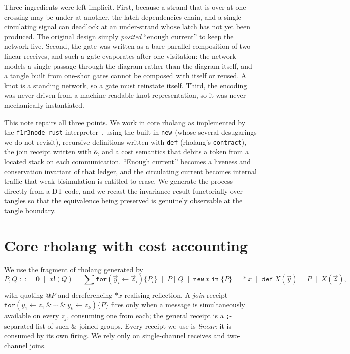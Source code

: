\documentclass[11pt]{article}
\theoremstyle{definition}
\newcommand{\Nil}{\mathbf{0}}
\begin{document}
Three ingredients were left implicit. First, because a strand that is over at one
crossing may be under at another, the latch dependencies chain, and a single
circulating signal can deadlock at an under-strand whose latch has not yet been
produced. The original design simply \emph{posited} ``enough current'' to keep the
network live. Second, the gate was written as a bare parallel composition of two
linear receives, and such a gate evaporates after one visitation: the network
models a single passage through the diagram rather than the diagram itself, and a
tangle built from one-shot gates cannot be composed with itself or reused. A knot
is a standing network, so a gate must reinstate itself. Third, the encoding was
never driven
from a machine-readable knot representation, so it was never mechanically
instantiated.

This note repairs all three points. We work in core rholang as implemented by the
\texttt{f1r3node-rust} interpreter~\cite{f1r3node}, using the built-in \texttt{new}
(whose several desugarings we do not revisit), recursive definitions written with
\texttt{def} (rholang's \texttt{contract}), the join receipt written with
\texttt{\&}, and a cost semantics that
debits a token from a located stack on each communication. ``Enough current''
becomes a liveness and conservation invariant of that ledger, and the circulating
current becomes internal traffic that weak bisimulation is entitled to erase. We
generate the process directly from a DT code, and we recast the invariance result
functorially over tangles so that the equivalence being preserved is genuinely
observable at the tangle boundary.

\section{Core rholang with cost accounting}

We use the fragment of rholang generated by
\[
P,Q \;::=\; \Nil \;\mid\; x!(Q) \;\mid\; \textstyle\sum_i \mathtt{for}(\vec y_i \leftarrow \vec z_i)\{P_i\}
      \;\mid\; P \mid Q \;\mid\; \mathtt{new}\,x\;\mathtt{in}\;\{P\} \;\mid\; {*}x
      \;\mid\; \mathtt{def}\ X(\vec y) = P \;\mid\; X(\vec z),
\]
with quoting $@P$ and dereferencing ${*}x$ realising reflection. A \emph{join}
receipt $\mathtt{for}(y_1 \leftarrow z_1\ \&\ \cdots\ \&\ y_k \leftarrow z_k)\{P\}$
fires only when a message is simultaneously available on every $z_j$, consuming
one from each; the general receipt is a \texttt{;}-separated list of such
$\&$-joined groups. Every receipt we use is \emph{linear}: it is consumed by its
own firing. We rely only on single-channel receives and two-channel joins.
\end{document}
